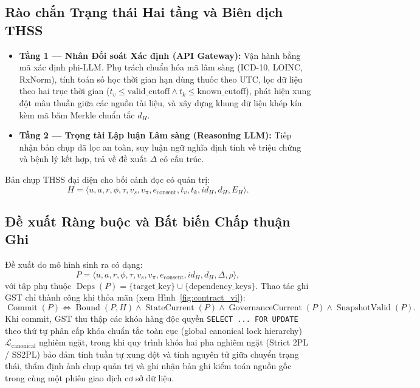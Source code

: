 \documentclass[11pt]{article}
\begin{document}
\subsection{Rào chắn Trạng thái Hai tầng và Biên dịch THSS}
\begin{itemize}
    \item \textbf{Tầng 1 — Nhân Đối soát Xác định (API Gateway):} Vận hành bằng mã xác định phi-LLM. Phụ trách chuẩn hóa mã lâm sàng (ICD-10, LOINC, RxNorm), tính toán số học thời gian hạn dùng thuốc theo UTC, lọc dữ liệu theo hai trục thời gian ($t_v \le \text{valid\_cutoff} \land t_k \le \text{known\_cutoff}$), phát hiện xung đột mâu thuẫn giữa các nguồn tài liệu, và xây dựng khung dữ liệu khép kín kèm mã băm Merkle chuẩn tắc $d_H$.
    \item \textbf{Tầng 2 — Trọng tài Lập luận Lâm sàng (Reasoning LLM):} Tiếp nhận bản chụp đã lọc an toàn, suy luận ngữ nghĩa định tính về triệu chứng và bệnh lý kết hợp, trả về đề xuất $\Delta$ có cấu trúc.
\end{itemize}

Bản chụp THSS đại diện cho bối cảnh đọc có quản trị:
\begin{equation}
H = \langle u, a, r, \phi, \tau, v_s, v_{\pi}, e_{\text{consent}}, t_v, t_k, id_H, d_H, E_H \rangle.
\label{eq:thss_vi}
\end{equation}

\subsection{Đề xuất Ràng buộc và Bất biến Chấp thuận Ghi}
Đề xuất do mô hình sinh ra có dạng:
\begin{equation}
P = \langle u, a, r, \phi, \tau, v_s, v_{\pi}, e_{\text{consent}}, id_H, d_H, \Delta, \rho \rangle,
\label{eq:proposal_vi}
\end{equation}
với tập phụ thuộc $\operatorname{Deps}(P) = \{ \text{target\_key} \} \cup \{ \text{dependency\_keys} \}$. Thao tác ghi GST chỉ thành công khi thỏa mãn (xem Hình~\ref{fig:contract_vi}):
\begin{equation}
\operatorname{Commit}(P) \iff \operatorname{Bound}(P, H) \land \operatorname{StateCurrent}(P) \land \operatorname{GovernanceCurrent}(P) \land \operatorname{SnapshotValid}(P).
\label{eq:commit_vi}
\end{equation}
Khi commit, GST thu thập các khóa hàng độc quyền \texttt{SELECT ... FOR UPDATE} theo thứ tự phân cấp khóa chuẩn tắc toàn cục (global canonical lock hierarchy) $\mathcal{L}_{\text{canonical}}$ nghiêm ngặt, trong khi quy trình khóa hai pha nghiêm ngặt (Strict 2PL / SS2PL) bảo đảm tính tuần tự xung đột và tính nguyên tử giữa chuyển trạng thái, thẩm định ảnh chụp quản trị và ghi nhận bản ghi kiểm toán nguồn gốc trong cùng một phiên giao dịch cơ sở dữ liệu.
\end{document}
